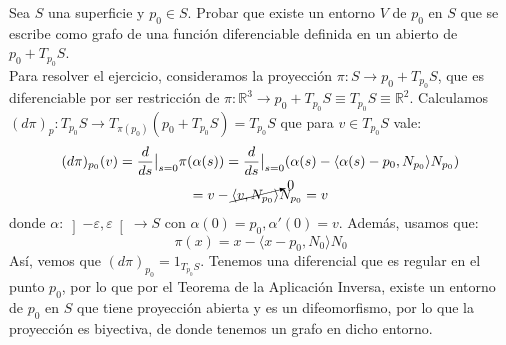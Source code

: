 \begin{ejercicio}
    Sea $S$ una superficie y $p_0\in S$. Probar que existe un entorno $V$ de $p_0$ en $S$ que se escribe como grafo de una función diferenciable definida en un abierto de $p_0 + T_{p_0}S$.\\

    \noindent
    Para resolver el ejercicio, consideramos la proyección $\pi:S\to p_0+T_{p_0}S$, que es diferenciable por ser restricción de $\pi:\mathbb{R}^3\to p_0 + T_{p_0}S\equiv T_{p_0}S\equiv \mathbb{R}^2$. Calculamos $(d\pi)_p:T_{p_0}S\to T_{\pi(p_0)}(p_0+T_{p_0}S)=T_{p_0}S$ que para $v\in T_{p_0}S$ vale:
    \begin{multline*}
        (d\pi)_{p_0}(v) = \frac{d}{ds}\big|_{s=0}\pi(\alpha(s)) = \frac{d}{ds}\big|_{s=0} (\alpha(s) - \langle \alpha(s)-p_0, N_{p_0}\rangle N_{p_0}  ) \\ = v - \cancelto{0}{\langle v,N_{p_0} \rangle} N_{p_0}  = v
    \end{multline*}
    donde $\alpha:\left]-\varepsilon,\varepsilon\right[\to S$ con $\alpha(0) = p_0, \alpha'(0) = v$. Además, usamos que:
    \begin{equation*}
        \pi(x) = x-\langle x-p_0,N_0 \rangle N_0
    \end{equation*}
    Así, vemos que $(d\pi)_{p_0} = 1_{T_{p_0}S}$. Tenemos una diferencial que es regular en el punto $p_0$, por lo que por el Teorema de la Aplicación Inversa, existe un entorno de $p_0$ en $S$ que tiene proyección abierta y es un difeomorfismo, por lo que la proyección es biyectiva, de donde tenemos un grafo en dicho entorno.
\end{ejercicio}

